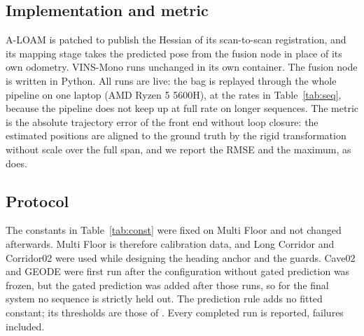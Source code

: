 \documentclass[journal]{IEEEtran}
\begin{document}
\begin{table}[t]
\caption{Sequences}
\label{tab:seq}
\centering\footnotesize
{}
\end{table}

\subsection{Implementation and metric}
A-LOAM \cite{aloam} is patched to publish the Hessian of its scan-to-scan registration, and its mapping stage takes the predicted pose from the fusion node in place of its own odometry. VINS-Mono runs unchanged in its own container. The fusion node is written in Python. All runs are live: the bag is replayed through the whole pipeline on one laptop (AMD Ryzen 5 5600H), at the rates in Table~\ref{tab:seq}, because the pipeline does not keep up at full rate on longer sequences. The metric is the absolute trajectory error of the front end without loop closure: the estimated positions are aligned to the ground truth by the rigid transformation without scale \cite{umeyama1991} over the full span, and we report the RMSE and the maximum, as \cite{switchslam2024} does.

\subsection{Protocol}
The constants in Table~\ref{tab:const} were fixed on Multi Floor and not changed afterwards. Multi Floor is therefore calibration data, and Long Corridor and Corridor02 were used while designing the heading anchor and the guards. Cave02 and GEODE were first run after the configuration without gated prediction was frozen, but the gated prediction was added after those runs, so for the final system no sequence is strictly held out. The prediction rule adds no fitted constant; its thresholds are those of \cite{switchslam2024}. Every completed run is reported, failures included.
\end{document}
